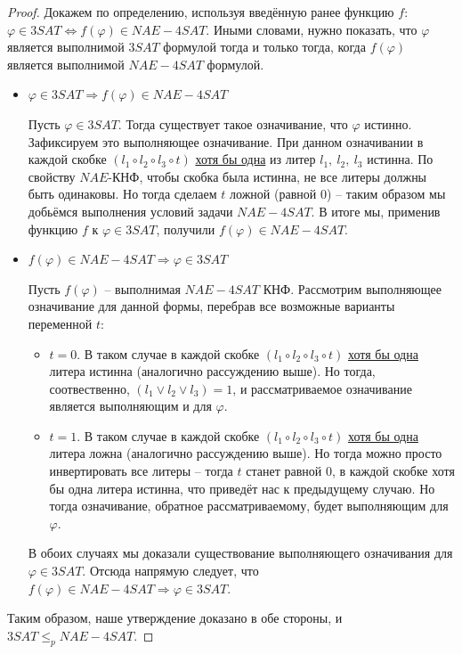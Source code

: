 \documentclass[a4paper,12pt]{article}
\begin{document}
\begin{proof}
    Докажем по определению, используя введённую ранее функцию $f$: $\varphi \in 3SAT \Longleftrightarrow f(\varphi) \in NAE-4SAT$. Иными словами, нужно показать, что $\varphi$ является выполнимой $3SAT$ формулой тогда и только тогда, когда $f(\varphi)$ является выполнимой $NAE-4SAT$ формулой.
    \begin{itemize}
        \item $\varphi \in 3SAT \Longrightarrow f(\varphi) \in NAE-4SAT$
        
        Пусть $\varphi \in 3SAT$. Тогда существует  такое означивание, что $\varphi$ истинно. Зафиксируем это выполняющее означивание. При данном означивании в каждой скобке $(l_1 \circ l_2 \circ l_3 \circ t)$ \underline{хотя бы одна} из литер $l_1,\ l_2,\ l_3$ истинна. По свойству $NAE$-КНФ, чтобы скобка была истинна, не все литеры должны быть одинаковы. Но тогда сделаем $t$ ложной (равной 0) -- таким образом мы добьёмся выполнения условий задачи $NAE-4SAT$. В итоге мы, применив функцию $f$ к $\varphi \in 3SAT$, получили $f(\varphi) \in NAE-4SAT$.
        \item $f(\varphi) \in NAE-4SAT \Longrightarrow  \varphi \in 3SAT$
        
        Пусть $f(\varphi)$ -- выполнимая $NAE-4SAT$ КНФ. Рассмотрим выполняющее означивание для данной формы, перебрав все возможные варианты переменной $t$:
        \begin{itemize}
            \item $t = 0$. В таком случае в каждой скобке $(l_1 \circ l_2 \circ l_3 \circ t)$ \underline{хотя бы одна} литера истинна (аналогично рассуждению выше). Но тогда, соотвественно, $(l_1 \vee l_2 \vee l_3) = 1$, и рассматриваемое означивание является выполняющим и для $\varphi$. 
            \item $t = 1$. В таком случае в каждой скобке $(l_1 \circ l_2 \circ l_3 \circ t)$ \underline{хотя бы одна} литера ложна (аналогично рассуждению выше). Но тогда можно просто инвертировать все литеры -- тогда $t$ станет равной 0, в каждой скобке хотя бы одна литера истинна, что приведёт нас к предыдущему случаю. Но тогда означивание, обратное рассматриваемому, будет выполняющим для $\varphi$.
        \end{itemize}
        В обоих случаях мы доказали существование выполняющего означивания для $\varphi \in 3SAT$. Отсюда напрямую следует, что $f(\varphi) \in NAE-4SAT \Longrightarrow  \varphi \in3SAT$.
    \end{itemize}
    Таким образом, наше утверждение доказано в обе стороны, и \\$3SAT \leqslant_p NAE-4SAT$.
\end{proof}
\end{document}
